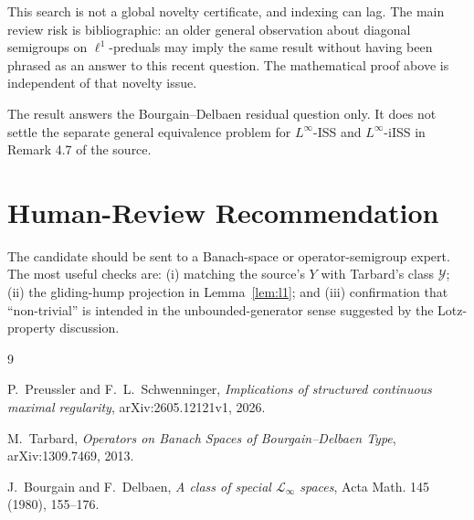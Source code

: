 \documentclass[11pt]{article}
\newcommand{\ellone}{\ell^{1}}
\begin{document}
This search is not a global novelty certificate, and indexing can lag.  The
main review risk is bibliographic: an older general observation about diagonal
semigroups on \(\ellone\)-preduals may imply the same result without having
been phrased as an answer to this recent question.  The mathematical proof
above is independent of that novelty issue.

The result answers the Bourgain--Delbaen residual question only.  It does not
settle the separate general equivalence problem for
\(L^\infty\)-ISS and \(L^\infty\)-iISS in Remark 4.7 of the source.

\section*{Human-Review Recommendation}

The candidate should be sent to a Banach-space or operator-semigroup expert.
The most useful checks are: (i) matching the source's \(Y\) with Tarbard's
class \(\mathcal Y\); (ii) the gliding-hump projection in
Lemma~\ref{lem:l1}; and (iii) confirmation that ``non-trivial'' is intended in
the unbounded-generator sense suggested by the Lotz-property discussion.

\begin{thebibliography}{9}

P.~Preussler and F.~L.~Schwenninger,
\emph{Implications of structured continuous maximal regularity},
arXiv:2605.12121v1, 2026.

M.~Tarbard,
\emph{Operators on Banach Spaces of Bourgain--Delbaen Type},
arXiv:1309.7469, 2013.

J.~Bourgain and F.~Delbaen,
\emph{A class of special \(\mathcal L_\infty\) spaces},
Acta Math. 145 (1980), 155--176.

\end{thebibliography}
\end{document}
